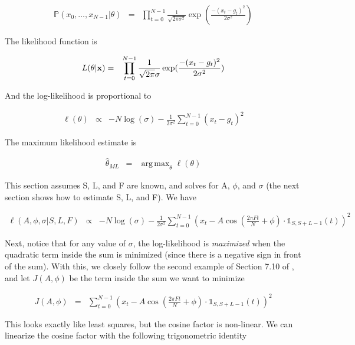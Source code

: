 \documentclass[11pt]{article}
\theoremstyle{plain}
\theoremstyle{definition}
\DeclareMathOperator*{\argmax}{arg\,max}
\begin{document}
\begin{eqnarray}
\label{eq:jointpdf}
	\mathbb{P}(x_0, \ldots, x_{N - 1} | \theta) &=& \prod_{t=0}^{N-1} \frac{1}{\sqrt{2 \pi \sigma^2}} \exp(\frac{-(x_t - g_t)^2}{2 \sigma^2})
\end{eqnarray}

\noindent The likelihood function is

\begin{eqnarray}
\label{eq:likelihood}
	L(\theta | {\bf x}) &=& \prod_{t=0}^{N-1} \frac{1}{\sqrt{2 \pi} \sigma} \exp(\frac{-(x_t - g_t)^2}{2 \sigma^2})
\end{eqnarray}

\noindent And the log-likelihood is proportional to

\begin{eqnarray}
\label{eq:loglikelihood}
	\ell(\theta) &\propto& -N \log(\sigma) - \frac{1}{2 \sigma^2} \sum_{t=0}^{N-1} (x_t - g_t)^2
\end{eqnarray}

\noindent The maximum likelihood estimate is

\begin{eqnarray}
	\hat{\theta}_{ML} &=& \argmax_{\theta} \ell(\theta)
\end{eqnarray}

This section assumes S, L, and F are known, and solves for A, $\phi$, and $\sigma$ (the next section shows how to estimate S, L, and F). We have

\begin{eqnarray}
	\ell(A, \phi, \sigma | S, L, F) &\propto& -N \log(\sigma) - \frac{1}{2 \sigma^2} \sum_{t=0}^{N-1} (x_t - A \cos(\frac{2 \pi F t}{N} + \phi) \cdot \mathbb{1}_{S, S+L-1}(t))^2
\end{eqnarray}

Next, notice that for any value of $\sigma$, the log-likelihood is {\it maximized} when the quadratic term inside the sum is minimized (since there is a negative sign in front of the sum). With this, we closely follow the second example of Section 7.10 of \cite{kay1993fundamentals}, and let $J(A, \phi)$ be the term inside the sum we want to minimize

\begin{eqnarray}
	J(A, \phi) &=& \sum_{t=0}^{N-1} (x_{t} - A \cos(\frac{2 \pi F t}{N} + \phi) \cdot \mathbb{1}_{S, S+L-1}(t))^2
\end{eqnarray}

\noindent This looks exactly like least squares, but the cosine factor is non-linear. We can linearize the cosine factor with the following trigonometric identity
\end{document}
